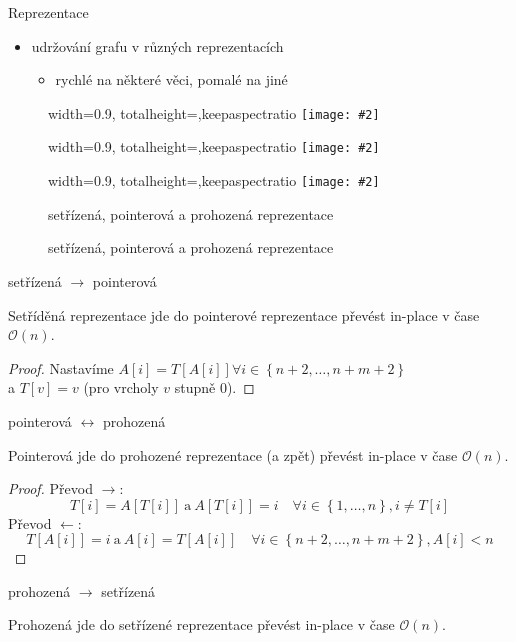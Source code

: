 \documentclass{beamer}
\makeatletter
\newcommand{\fitimage}[2][\@nil]{
	\begin{figure}
		\begin{adjustbox}{width=0.9\textwidth, totalheight=\textheight-2\baselineskip-2\baselineskip,keepaspectratio}
			\texttt{[image: \#2]}
		\end{adjustbox}
		\def\tmp{#1}%
	 \ifx\tmp\@nnil
			\else
			\caption{#1}
		\fi
	\end{figure}
}
\makeatother
\begin{document}
	\begin{frame}{Reprezentace}
		\begin{itemize}
			\item udržování grafu v různých reprezentacích
			\begin{itemize}
				\item rychlé na některé věci, pomalé na jiné
			\end{itemize}
		\end{itemize}

		\fitimage{images/sorted.png}
		\fitimage{images/pointer.png}
		\fitimage[setřízená, pointerová a prohozená reprezentace]{images/swapped.png}
	\end{frame}

	\begin{frame}{setřízená $\rightarrow$ pointerová}
		\begin{lemma}
			Setříděná reprezentace jde do pointerové reprezentace převést in-place v čase $\mathcal{O}\left(n\right)$.
		\end{lemma}

		\begin{proof}
			Nastavíme $A[i] = T\left[A\left[i\right]\right] \forall i \in \left\{n + 2, \ldots, n + m + 2\right\}$ \\
			a $T\left[v\right] = v$ (pro vrcholy $v$ stupně $0$).
		\end{proof}
	\end{frame}

	\begin{frame}{pointerová $\longleftrightarrow$ prohozená}
		\begin{lemma}
			Pointerová jde do prohozené reprezentace (a zpět) převést in-place v čase $\mathcal{O}\left(n\right)$.
		\end{lemma}

		\begin{proof}
			Převod $\rightarrow$: $$T[i] = A[T[i]]\ \text{a}\ A[T[i]] = i\quad \forall i \in \left\{1, \ldots, n\right\}, i \neq T[i]$$
			Převod $\leftarrow$: $$T[A[i]] = i\ \text{a}\ A[i] = T[A[i]]\quad \forall i \in \left\{n + 2, \ldots, n + m + 2\right\}, A[i] < n$$
		\end{proof}
	\end{frame}

	\begin{frame}{prohozená $\rightarrow$ setřízená}
		\begin{lemma}
			Prohozená jde do setřízené reprezentace převést in-place v čase $\mathcal{O}\left(n\right)$.
		\end{lemma}
	\end{frame}
\end{document}
